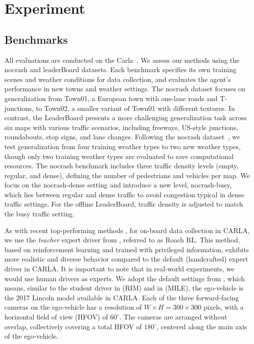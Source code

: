 \section{Experiment}
%	

\subsection{Benchmarks} \label{sec:Dataset}

\hspace{1pc}All evaluations are conducted on the Carla~\cite{Dosovitskiy:2017}. 
We assess our methods using the nocrash \cite{codevilla2019exploring} and leaderBoard datasets. 
Each benchmark specifies its own training scenes and weather conditions for data collection, and evaluates the agent's performance in new towns and weather settings. 
The nocrash dataset focuses on generalization from Town01, a European town with one-lane roads and T-junctions, to Town02, a smaller variant of Town01 with different textures. 
In contrast, the LeaderBoard presents a more challenging generalization task across six maps with various traffic scenarios, including freeways, US-style junctions, roundabouts, stop signs, and lane changes. 
Following the nocrash dataset~\cite{codevilla2019exploring}, we test generalization from four training weather types to two new weather types, though only two training weather types are evaluated to save computational resources. 
The nocrash benchmark includes three traffic density levels (empty, regular, and dense), defining the number of pedestrians and vehicles per map. 
We focus on the nocrash-dense setting and introduce a new level, nocrash-busy, which lies between regular and dense traffic to avoid congestion typical in dense traffic settings. 
For the offline LeaderBoard, traffic density is adjusted to match the busy traffic setting. 


As with recent top-performing methods \cite{Hu:2022}, for on-board data collection in CARLA, we use the \emph{teacher} expert driver from \cite{Zhang:2021}, referred to as Roach RL.
This method, based on reinforcement learning and trained with privileged information, exhibits more realistic and diverse behavior compared to the default (handcrafted) expert driver in CARLA. 
It is important to note that in real-world experiments, we would use human drivers as experts.
We adopt the default settings from \cite{Zhang:2021}, which means, similar to the student driver in \cite{Zhang:2021} (RIM) and in \cite{Hu:2022} (MILE), the ego-vehicle is the 2017 Lincoln model available in CARLA.
Each of the three forward-facing cameras on the ego-vehicle has a resolution of $W\times H=300\times300$ pixels, with a horizontal field of view (HFOV) of $60^{\circ}$.
The cameras are arranged without overlap, collectively covering a total HFOV of $180^{\circ}$, centered along the main axis of the ego-vehicle.


